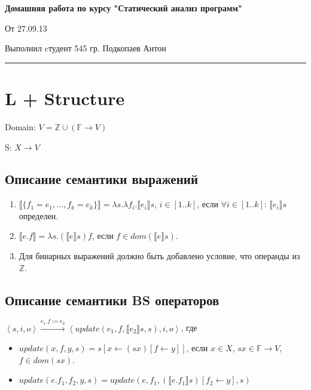 \documentclass{article}
\newcommand{\sembr}[1]{\llbracket{#1}\rrbracket}
\newcommand{\trans}[3]{{#1}\xrightarrow{#2}{#3}}
\newcommand{\inbr}[1]{\left<{#1}\right>}
\begin{document}
\textbf{Домашняя работа по курсу "Статический анализ программ"}

\hfill От 27.09.13

\hfill Выполнил cтудент 545 гр. Подкопаев Антон

\hrule
\vspace{1.2cm}

\section{L + Structure}

Domain: $V = \mathbb{Z} \cup (\mathbb{F} \to V)$

S: $X \to V$

\subsection{Описание семантики выражений}

\begin{enumerate}
\item $\sembr{\{f_{1} = e_{1}, ..., f_{k} = e_{k}\}} = \lambda s.\lambda f_{i}.\sembr{e_{i}}s$, $i \in [1..k]$, если $\forall i \in [1..k]$: $\sembr{e_{i}}s$ определен.

\item $\sembr{e.f} = \lambda s.(\sembr{e}s)f$, если $f \in dom(\sembr{e}s)$. 

\item Для бинарных выражений должно быть добавлено условие, что операнды из $\mathbb{Z}$.
\end{enumerate}

\subsection{Описание семантики BS операторов}

$\trans{\inbr{s, i, o}}{e_{1}.f := e_{2}}{\inbr{update(e_{1}, f, \sembr{e_{2}}s, s), i, o}}$, где

\begin{itemize}
	\item $update(x, f, y, s) = s[x \gets (s x)[f \gets y]]$, если $x \in X$, $s x \in \mathbb{F} \to V$, $f \in dom(s x)$.
	\item $update(e.f_{1}, f_{2}, y, s) = update(e, f_{1}, (\sembr{e.f_{1}}s)[f_{2} \gets y], s)$
\end{itemize}
\end{document}
